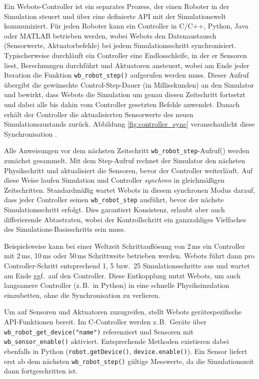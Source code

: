   Ein Webots\mbox{-}Controller ist ein separates Prozess, der einen Roboter in der Simulation steuert
  und über eine definierte API mit der Simulationswelt kommuniziert. Für jeden Roboter kann ein Controller in 
  C/C++, Python, Java oder MATLAB betrieben werden, wobei Webots den Datenaustausch (Sensorwerte, Aktuatorbefehle) bei 
  jedem Simulationsschritt synchronisiert. Typischerweise durchläuft ein Controller eine Endlosschleife, in 
  der er Sensoren liest, Berechnungen durchführt und Aktuatoren ansteuert, wobei am Ende jeder Iteration die 
  Funktion \texttt{wb\_robot\_step()} aufgerufen werden muss. Dieser Aufruf übergibt die gewünschte 
  Control\mbox{-}Step\mbox{-}Dauer (in Millisekunden) an den Simulator und bewirkt, dass Webots die 
  Simulation um genau diesen Zeitschritt fortsetzt und dabei alle bis dahin vom Controller gesetzten 
  Befehle anwendet. Danach erhält der Controller die aktualisierten Sensorwerte des neuen Simulationszustands 
  zurück. Abbildung \ref{fig:controller_sync} veranschaulicht diese Synchronisation \citep{cyberbotics_controller_programming}.
  

 

  Alle Anweisungen vor dem nächsten Zeitschritt \texttt{wb\_robot\_step}\mbox{-}Aufruf() werden zunächst gesammelt.
  Mit dem Step\mbox{-}Aufruf rechnet der Simulator den nächsten Physikschritt und aktualisiert die Sensoren, bevor 
  der Controller weiterläuft. Auf diese Weise laufen Simulation und Controller \emph{synchron} in gleichmäßigen
   Zeitschritten. Standardmäßig wartet Webots in diesem synchronen Modus darauf, dass jeder Controller seinen \texttt{wb\_robot\_step} 
  ausführt, bevor der nächste Simulationsschritt erfolgt. Dies garantiert Konsistenz, erlaubt aber auch differierende Abtastraten, 
  wobei der Kontrollschritt ein ganzzahliges Vielfaches des Simulations\mbox{-}Basisschritts sein muss.

  Beispielsweise kann bei einer Weltzeit Schrittauflösung von 2\,ms ein Controller mit 2\,ms, 10\,ms oder 50\,ms 
  Schrittweite betrieben werden. Webots führt dann pro Controller-Schritt entsprechend 1, 5 bzw.\ 25 Simulationsschritte 
  aus und wartet am Ende ggf.\ auf den Controller. Diese Entkopplung nutzt Webots, um auch langsamere Controller (z.\,B.\ in Python) 
  in eine schnelle Physiksimulation einzubetten, ohne die Synchronisation zu verlieren.

  Um auf Sensoren und Aktuatoren zuzugreifen, stellt Webots gerätespezifische API\mbox{-}Funktionen bereit. Im C\mbox{-}Controller 
  werden z.\,B.\ Geräte über \texttt{wb\_robot\_get\_device("name")} referenziert und Sensoren mit \texttt{wb\_sensor\_enable()} 
  aktiviert. Entsprechende Methoden existieren dabei ebenfalls in Python (\texttt{robot.getDevice()}, \texttt{device.enable()}). Ein Sensor liefert 
  erst ab dem nächsten \texttt{wb\_robot\_step()} gültige Messwerte, da die Simulationszeit dann fortgeschritten ist. 

